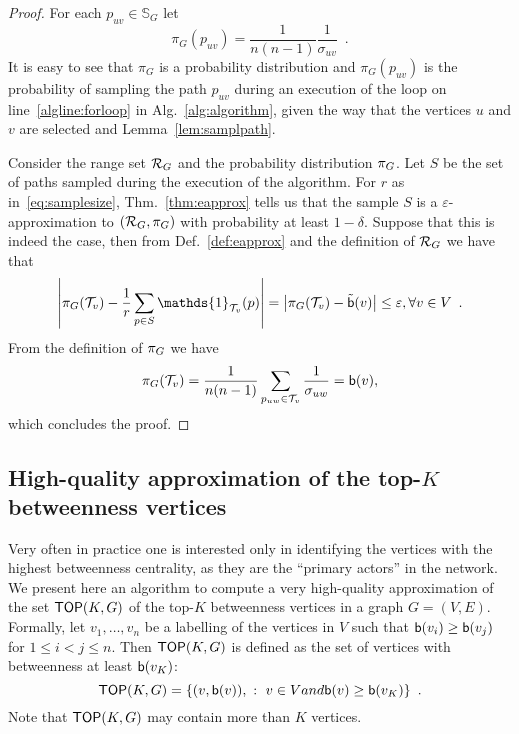 \begin{proof}
  For each $p_{uv}\in\mathbb{S}_G$ let
  \[
  \pi_G(p_{uv})=\frac{1}{n(n-1)}\frac{1}{\sigma_{uv}}\enspace.
  \]
  It is easy to see that $\pi_G$ is a probability distribution and
  $\pi_G(p_{uv})$ is the probability of sampling the path $p_{uv}$ during an
  execution of the loop on line~\ref{algline:forloop} in
  Alg.~\ref{alg:algorithm}, given the way that the vertices $u$ and $v$ are
  selected and Lemma~\ref{lem:samplpath}.
  
  Consider the range set $\mathcal{R}_G$ and the probability distribution $\pi_G$.
  Let $S$ be the set of paths sampled during the execution of the algorithm.
  For $r$ as in~\eqref{eq:samplesize}, Thm.~\ref{thm:eapprox} tells us that the sample $S$ is a
  $\varepsilon$-approximation to $(\mathcal{R}_G,\pi_G)$ with probability at least
  $1-\delta$. Suppose that this is indeed the case, then from
  Def.~\ref{def:eapprox} and the definition of $\mathcal{R}_G$ we have that
  \[
  \left|\prob_G(\mathcal{T}_v) - \frac{1}{r}\sum_{p\in
  S}\mathds{1}_{\mathcal{T}_v}(p)\right|=\left|\prob_G(\mathcal{T}_v) -
  \tilde\betw(v)\right|\le\varepsilon, \forall v\in
  V\enspace.
  \]
  From the definition of $\pi_G$ we have
  \[
  \pi_G(\mathcal{T}_v)=\frac{1}{n(n-1)}\sum_{p_{uw}\in\mathcal{T}_v}\frac{1}{\sigma_{uw}}=\mathsf{b}(v),
  \]
  which concludes the proof.
\end{proof}

\subsection{High-quality approximation of the top-$K$ betweenness
vertices}\label{sec:topk}

Very often in practice one is interested only in identifying the vertices with
the highest betweenness centrality, as they are the ``primary actors'' in the
network. We present here an algorithm to compute a very high-quality
approximation of the set $\mathsf{TOP}(K,G)$ of the top-$K$ betweenness vertices in a graph
$G=(V,E)$. Formally, let $v_1,\dotsc,v_n$ be a labelling of the vertices in $V$
such that $\mathsf{b}(v_i)\ge\mathsf{b}(v_j)$ for $1\le i<j\le n$. Then $\mathsf{TOP}(K,G)$ is
defined as the set of vertices with betweenness at least $\mathsf{b}(v_K)$:
\[
\mathsf{TOP}(K,G)=\{(v,\mathsf{b}(v)), ~:~ v\in V \relax{ and } \mathsf{b}(v)\ge\mathsf{b}(v_K)\}\enspace.
\]
Note that $\mathsf{TOP}(K,G)$ may contain more than $K$ vertices. 

